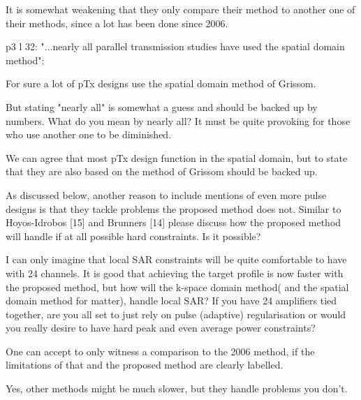 \documentclass[11pt]{article}
\begin{document}
 It is somewhat weakening that they only compare their method to another one of their methods, since a lot has been done since 2006.

p3 l 32: "...nearly all parallel transmission studies have used the spatial domain method":

For sure a lot of pTx designs use the spatial domain method of Grissom.

But stating "nearly all" is somewhat a guess and should be backed up by numbers. What do you mean by nearly all? It must be quite provoking for those who use another one to be diminished.

We can agree that most pTx design function in the spatial domain, but to state that they are also based on the method of Grissom should be backed up.

As discussed below, another reason to include mentions of even more pulse designs is that they tackle problems the proposed method does not. Similar to Hoyos-Idrobos [15] and Brunners [14] please discuss how the proposed method will handle if at all possible hard constraints. Is it possible?

I can only imagine that local SAR constraints will be quite comfortable to have with 24 channels. It is good that achieving the target profile is now faster with the proposed method, but how will the k-space domain method( and the spatial domain method for matter), handle local SAR? If you have 24 amplifiers tied together, are you all set to just rely on pulse (adaptive) regularisation or would you really desire to have hard peak and even average power constraints?

One can accept to only witness a comparison to the 2006 method, if the limitations of that and the proposed method are clearly labelled.

Yes, other methods might be much slower, but they handle problems you don't.
\\[0.2em]
\indent{\it \textcolor{blue}{We agree that we needed to tone down the language here. We have revised wording to indicate that nearly all parallel transmission studies have been formulated in the spatial domain, rather than being explicitly derived directly from the spatial domain method.
We have also added in the Discussion that it is not clear at this time whether or how hard power or SAR constraints could be directly built in to the method,
though the method would be compatible with parallel transmit VERSE methods.}}
\\[1.2em]
\end{document}
